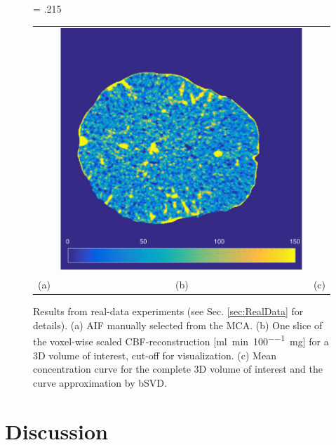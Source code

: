 \documentclass[journal,twocolumn]{IEEEtran}
\newlength{\fwd}
\begin{document}
	\begin{figure}[h!tb]\label{fig:RealData}
		\fwd = .215\textwidth
		\centering
		\begin{tabular}{ccc}
		 {\small} & \includegraphics[width = \fwd]{./figs/real_axial160.pdf} & {\small} \\
		 (a) & (b) & (c) 
		\end{tabular}
		\caption{Results from real-data experiments (see Sec. \ref{sec:RealData} for details). (a) AIF manually selected from the MCA. (b) One slice of the voxel-wise scaled CBF-reconstruction [\si{\milli\litre\per\minute\per100\milli\gram}] for a 3D volume of interest, cut-off for visualization. (c) Mean concentration curve for the complete 3D volume of interest and the curve approximation by bSVD.}
	\end{figure}


	
	
	\section{Discussion}\label{sec:conclusion}
\end{document}
